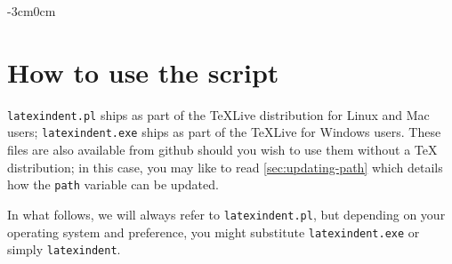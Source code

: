 \documentclass[10pt]{article}
\newenvironment{widepage}{\begin{adjustwidth}{-3cm}{0cm}}{\end{adjustwidth}}
\begin{document}
 \begin{widepage}
  \centering
  \begin{minipage}{.45\linewidth}
  \end{minipage}\hfill
  \begin{minipage}{.45\linewidth}
  \end{minipage}%

  \begin{minipage}{.45\linewidth}
  \end{minipage}\hfill
  \begin{minipage}{.45\linewidth}
  \end{minipage}%

  \begin{minipage}{.45\linewidth}
  \end{minipage}\hfill
  \begin{minipage}{.45\linewidth}
  \end{minipage}%
 \end{widepage}

\section{How to use the script}\label{sec:how:to:use}
 \texttt{latexindent.pl} ships as part of the \TeX Live distribution for
 Linux and Mac users; \texttt{latexindent.exe} ships as part of the \TeX Live for Windows
 users. These files are also available from github \cite{latexindent-home} should you wish
 to use them without a \TeX{} distribution; in this case, you may like to read
 \vref{sec:updating-path} which details how the \texttt{path} variable can be updated.

 In what follows, we will always refer to \texttt{latexindent.pl}, but depending on your
 operating system and preference, you might substitute \texttt{latexindent.exe} or simply
 \texttt{latexindent}.
\end{document}
